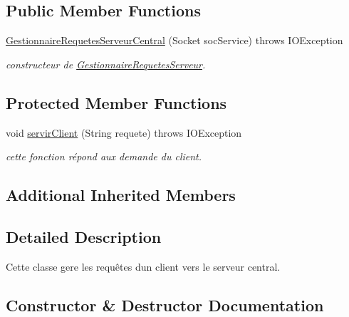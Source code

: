 \subsection*{Public Member Functions}
\begin{DoxyCompactItemize}
\item 
\hyperlink{classgestionnaireRequete_1_1GestionnaireRequetesServeurCentral_a51ac22ccddf0c79c588f596118dd39ae}{Gestionnaire\+Requetes\+Serveur\+Central} (Socket soc\+Service)  throws I\+O\+Exception 
\begin{DoxyCompactList}\small\item\em constructeur de \hyperlink{classgestionnaireRequete_1_1GestionnaireRequetesServeur}{Gestionnaire\+Requetes\+Serveur}. \end{DoxyCompactList}\end{DoxyCompactItemize}
\subsection*{Protected Member Functions}
\begin{DoxyCompactItemize}
\item 
void \hyperlink{classgestionnaireRequete_1_1GestionnaireRequetesServeurCentral_a7e4ac9416e0d8c5d68857775aea589d6}{servir\+Client} (String requete)  throws I\+O\+Exception 
\begin{DoxyCompactList}\small\item\em cette fonction répond aux demande du client. \end{DoxyCompactList}\end{DoxyCompactItemize}
\subsection*{Additional Inherited Members}


\subsection{Detailed Description}
Cette classe gere les requêtes d\textquotesingle{}un client vers le serveur central. 

\subsection{Constructor \& Destructor Documentation}
\mbox{\label{classgestionnaireRequete_1_1GestionnaireRequetesServeurCentral_a51ac22ccddf0c79c588f596118dd39ae}} 
